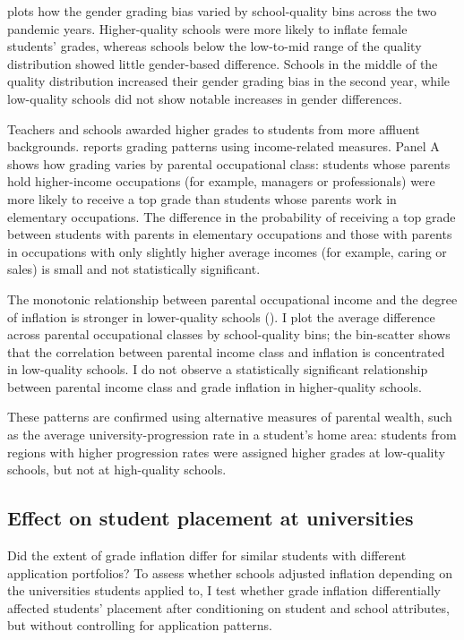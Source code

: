  plots how the gender grading bias varied by school-quality bins across the two pandemic years. Higher-quality schools were more likely to inflate female students' grades, whereas schools below the low-to-mid range of the quality distribution showed little gender-based difference. Schools in the middle of the quality distribution increased their gender grading bias in the second year, while low-quality schools did not show notable increases in gender differences.

Teachers and schools awarded higher grades to students from more affluent backgrounds.  reports grading patterns using income-related measures. Panel A shows how grading varies by parental occupational class: students whose parents hold higher-income occupations (for example, managers or professionals) were more likely to receive a top grade than students whose parents work in elementary occupations. The difference in the probability of receiving a top grade between students with parents in elementary occupations and those with parents in occupations with only slightly higher average incomes (for example, caring or sales) is small and not statistically significant.

The monotonic relationship between parental occupational income and the degree of inflation is stronger in lower-quality schools (). I plot the average difference across parental occupational classes by school-quality bins; the bin-scatter shows that the correlation between parental income class and inflation is concentrated in low-quality schools. I do not observe a statistically significant relationship between parental income class and grade inflation in higher-quality schools.

These patterns are confirmed using alternative measures of parental wealth, such as the average university-progression rate in a student's home area: students from regions with higher progression rates were assigned higher grades at low-quality schools, but not at high-quality schools.


\subsection{Effect on student placement at universities}

Did the extent of grade inflation differ for similar students with different application portfolios? To assess whether schools adjusted inflation depending on the universities students applied to, I test whether grade inflation differentially affected students' placement after conditioning on student and school attributes, but without controlling for application patterns.

